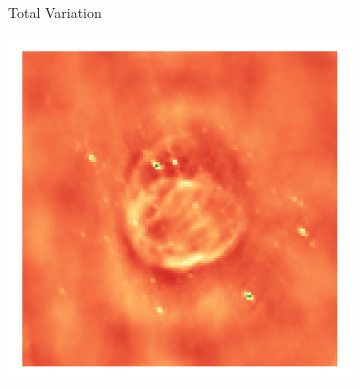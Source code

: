 \begin{figure}[h]
\begin{subfigure}[b]{0.3\linewidth}
	\end{subfigure}
	\begin{subfigure}[b]{0.3\linewidth}
		\begin{center}Total Variation\end{center}
		\includegraphics[width=\linewidth, trim={18px 19px 18px 18px}, clip]{./chapters/05.results/g55/TV_image.png}
	\end{subfigure}


\end{figure}
